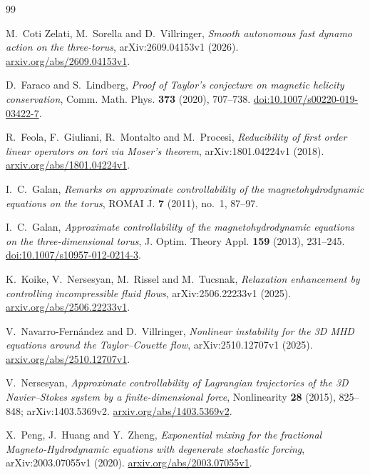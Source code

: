 \documentclass[11pt,a4paper]{amsart}
\theoremstyle{definition}
\theoremstyle{remark}
\numberwithin{equation}{section}
\begin{document}
\begin{thebibliography}{99}

M.~Coti Zelati, M.~Sorella and D.~Villringer,
\emph{Smooth autonomous fast dynamo action on the three-torus},
arXiv:2609.04153v1 (2026).
\href{https://arxiv.org/abs/2609.04153v1}{arxiv.org/abs/2609.04153v1}.

D.~Faraco and S.~Lindberg,
\emph{Proof of Taylor's conjecture on magnetic helicity conservation},
Comm. Math. Phys. \textbf{373} (2020), 707--738.
\href{https://doi.org/10.1007/s00220-019-03422-7}{doi:10.1007/s00220-019-03422-7}.

R.~Feola, F.~Giuliani, R.~Montalto and M.~Procesi,
\emph{Reducibility of first order linear operators on tori via Moser's theorem},
arXiv:1801.04224v1 (2018).
\href{https://arxiv.org/abs/1801.04224v1}{arxiv.org/abs/1801.04224v1}.

I.~C.~Galan,
\emph{Remarks on approximate controllability of the magnetohydrodynamic equations on the torus},
ROMAI J. \textbf{7} (2011), no.~1, 87--97.

I.~C.~Galan,
\emph{Approximate controllability of the magnetohydrodynamic equations on the three-dimensional torus},
J. Optim. Theory Appl. \textbf{159} (2013), 231--245.
\href{https://doi.org/10.1007/s10957-012-0214-3}{doi:10.1007/s10957-012-0214-3}.

K.~Koike, V.~Nersesyan, M.~Rissel and M.~Tucsnak,
\emph{Relaxation enhancement by controlling incompressible fluid flows},
arXiv:2506.22233v1 (2025).
\href{https://arxiv.org/abs/2506.22233v1}{arxiv.org/abs/2506.22233v1}.

V.~Navarro-Fern\'andez and D.~Villringer,
\emph{Nonlinear instability for the 3D MHD equations around the Taylor--Couette flow},
arXiv:2510.12707v1 (2025).
\href{https://arxiv.org/abs/2510.12707v1}{arxiv.org/abs/2510.12707v1}.

V.~Nersesyan,
\emph{Approximate controllability of Lagrangian trajectories of the 3D Navier--Stokes system by a finite-dimensional force},
Nonlinearity \textbf{28} (2015), 825--848; arXiv:1403.5369v2.
\href{https://arxiv.org/abs/1403.5369v2}{arxiv.org/abs/1403.5369v2}.

X.~Peng, J.~Huang and Y.~Zheng,
\emph{Exponential mixing for the fractional Magneto-Hydrodynamic equations with degenerate stochastic forcing},
arXiv:2003.07055v1 (2020).
\href{https://arxiv.org/abs/2003.07055v1}{arxiv.org/abs/2003.07055v1}.


\end{thebibliography}
\end{document}
